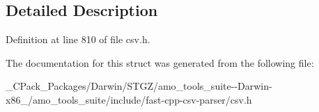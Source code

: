 \subsection{Detailed Description}


Definition at line 810 of file csv.\+h.



The documentation for this struct was generated from the following file\+:\begin{DoxyCompactItemize}
\item 
\+\_\+\+C\+Pack\+\_\+\+Packages/\+Darwin/\+S\+T\+G\+Z/amo\+\_\+tools\+\_\+suite-\/-\/\+Darwin-\/x86\+\_/amo\+\_\+tools\+\_\+suite/include/fast-\/cpp-\/csv-\/parser/csv.\+h\end{DoxyCompactItemize}
